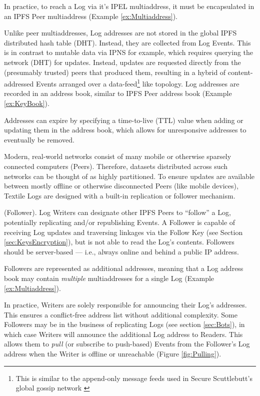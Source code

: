 \documentclass{textile}
\begin{document}
In practice, to reach a Log via it's IPEL multiaddress, it must be encapsulated in an IPFS Peer multiaddress (Example \ref{ex:Multiaddress}).

Unlike peer multiaddresses, Log addresses are not stored in the global IPFS distributed hash table \cite{benetIPFSContentAddressed2014} (DHT). Instead, they are collected from Log Events. This is in contrast to mutable data via IPNS for example, which requires querying the network (DHT) for updates. Instead, updates are requested directly from the (presumably trusted) peers that produced them, resulting in a hybrid of content-addressed Events arranged over a data-feed\footnote{This is similar to the append-only message feeds used in Secure Scuttlebutt’s global gossip network \cite{securescuttlebuttScuttlebuttProtocolGuide}} like topology. Log addresses are recorded in an address book, similar to IPFS Peer address book (Example \ref{ex:KeyBook}).

Addresses can expire by specifying a time-to-live (TTL) value when adding or updating them in the address book, which allows for unresponsive addresses to eventually be removed.

Modern, real-world networks consist of many mobile or otherwise sparsely connected computers (Peers). Therefore, datasets distributed across such networks can be thought of as highly partitioned. To ensure updates are available between mostly offline or otherwise disconnected Peers (like mobile devices), Textile Logs are designed with a built-in replication or follower mechanism.

\begin{definition} (Follower). Log Writers can designate other IPFS Peers to ``follow'' a Log, potentially replicating and/or republishing Events. A Follower is capable of receiving Log updates and traversing linkages via the Follow Key (see Section  \ref{sec:KeysEncryption}), but is not able to read the Log's contents. Followers should be server-based --- i.e., always online and behind a public IP address.\end{definition}

Followers are represented as additional addresses, meaning that a Log address book may contain \emph{multiple} multiaddresses for a single Log (Example \ref{ex:Multiaddress}).

In practice, Writers are solely responsible for announcing their Log's addresses. This ensures a conflict-free address list without additional complexity. Some Followers may be in the business of replicating Logs (see section  \ref{sec:Bots}), in which case Writers will announce the additional Log address to Readers. This allows them to \emph{pull} (or subscribe to push-based) Events from the Follower's Log address when the Writer is offline or unreachable (Figure \ref{fig:Pulling}).
\end{document}
